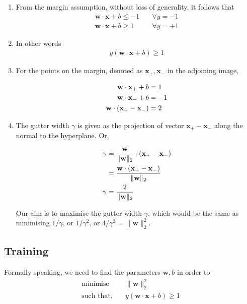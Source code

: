 \documentclass[11pt]{article}
\begin{document}
\begin{enumerate}
\item From the margin assumption, without loss of
generality, it follows that \\[0pt]
\begin{align*}
   \mathbf{w}\cdot\mathbf{x}+b \leqslant -1 &\quad
   \forall y=-1 \\
   \mathbf{w}\cdot\mathbf{x}+b \geqslant 1 &\quad
   \forall y=+1
\end{align*}

\item In other words
\begin{align}
  y(\mathbf{w}\cdot\mathbf{x}+b) \geqslant 1
\end{align}

\item For the points on the margin, denoted as
\(\mathbf{x}_{+}, \mathbf{x}_{-}\) in the adjoining
image,

\begin{align}
  \notag\mathbf{w}\cdot\mathbf{x}_{+} + b &= 1 \\
  \notag\mathbf{w}\cdot\mathbf{x}_{-} + b &= -1 \\
  \mathbf{w}\cdot(\mathbf{x}_{+}-\mathbf{x}_{-}) &= 2
\end{align}

\item The gutter width \(\gamma\) is given as the
projection of vector \(\mathbf{x}_{+} -
    \mathbf{x}_{-}\) along the normal to the hyperplane.
Or,

\begin{align}
  \notag
  \gamma &= \frac{\mathbf{w}}{\|\mathbf{w}\|_2} \cdot
           (\mathbf{x}_{+}-\mathbf{x}_{-}) \\
  \notag &= \frac{\mathbf{w}\cdot
           (\mathbf{x}_{+}-\mathbf{x}_{-})}
           {\|\mathbf{w}\|_2} \\
  \gamma &= \frac{2}{\|\mathbf{w}\|_2}
\end{align}

Our aim is to maximise the gutter width \(\gamma\),
which would be the same as minimising \(1/\gamma\),
or \(1/\gamma^{2}\), or \(4/\gamma^{2} =
    \|\mathbf{w}\|_{2}^{2}\).
\end{enumerate}


\subsection{Training}
\label{sec:org292b2f0}

Formally speaking, we need to find the parameters
\(\mathbf{w},b\) in order to
\begin{align*}
  \text{minimise} &\quad\|\mathbf{w}\|_2^2 \\
  \text{such that,} &\quad y(\mathbf{w}\cdot\mathbf{x}
                      + b) \geqslant 1
\end{align*}
\end{document}
